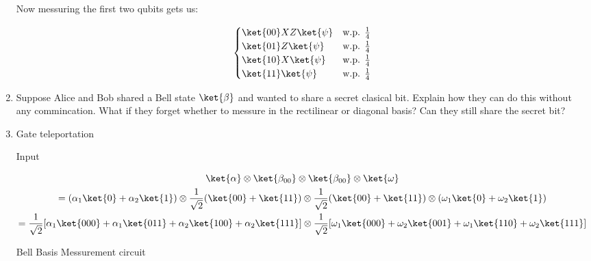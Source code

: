 \documentclass[]{article}
\begin{document}
\begin{enumerate}
        Now messuring the first two qubits gets us:

        \[ \begin{cases} 
          \ket{00} XZ\ket{\psi} & \text{w.p. } \frac{1}{4} \\
          \ket{01} Z\ket{\psi} & \text{w.p. } \frac{1}{4} \\
          \ket{10} X\ket{\psi} & \text{w.p. } \frac{1}{4} \\
          \ket{11} \ket{\psi} & \text{w.p. } \frac{1}{4} \\
          \end{cases}
        \]


      \item Suppose Alice and Bob shared a Bell state $\ket{\beta}$ and wanted to share a secret
        clasical bit. Explain how they can do this without any commincation. What if they forget whether
        to messure in the rectilinear or diagonal basis? Can they still share the secret bit?

      \item Gate teleportation

        Input

        \begin{gather*}
          \ket{\alpha} \otimes \ket{\beta_{00}} \otimes \ket{\beta_{00}} \otimes \ket{\omega}\\
          =(\alpha_1 \ket{0} + \alpha_2 \ket{1}) \otimes \frac{1}{\sqrt{2}}(\ket{00} + \ket{11})
          \otimes \frac{1}{\sqrt{2}}(\ket{00} + \ket{11}) \otimes (\omega_1 \ket{0} + \omega_2 \ket{1})\\
          =\frac{1}{\sqrt{2}}[\alpha_1 \ket{000} + \alpha_1 \ket{011} + \alpha_2 \ket{100} + \alpha_2 \ket{111}]
          \otimes \frac{1}{\sqrt{2}}[\omega_1 \ket{000} + \omega_2 \ket{001} + 
          \omega_1 \ket{110} + \omega_2 \ket{111}]\\
        \end{gather*}

        Bell Basis Messurement circuit


\end{enumerate}
\end{document}

